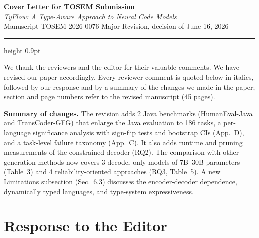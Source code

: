 \documentclass[11pt,a4paper]{article}
\begin{document}
\thispagestyle{firststyle}

\begin{center}
{\LARGE\bfseries\color{accent}Cover Letter for TOSEM Submission}\\[5pt]
{\large\itshape TyFlow: A Type-Aware Approach to Neural Code Models}\\[7pt]
{\small Manuscript TOSEM-2026-0076 \quad\textbullet\quad Major Revision, decision of June 16, 2026}
\end{center}
\vspace{-2pt}
{\color{accent!55}\hrule height 0.9pt}
\vspace{4pt}

We thank the reviewers and the editor for their valuable comments. We have revised our paper accordingly. Every reviewer comment is quoted below in italics, followed by our response and by a summary of the changes we made in the paper; section and page numbers refer to the revised manuscript (45 pages).

\textbf{Summary of changes.} The revision adds 2 Java benchmarks (HumanEval-Java and TransCoder-GFG) that enlarge the Java evaluation to 186 tasks, a per-language significance analysis with sign-flip tests and bootstrap CIs (App.~D), and a task-level failure taxonomy (App.~C). It also adds runtime and pruning measurements of the constrained decoder (RQ2). The comparison with other generation methods now covers 3 decoder-only models of 7B--30B parameters (Table~3) and 4 reliability-oriented approaches (RQ3, Table~5). A new Limitations subsection (Sec.~6.3) discusses the encoder-decoder dependence, dynamically typed languages, and type-system expressiveness.

\section*{Response to the Editor}
\end{document}
